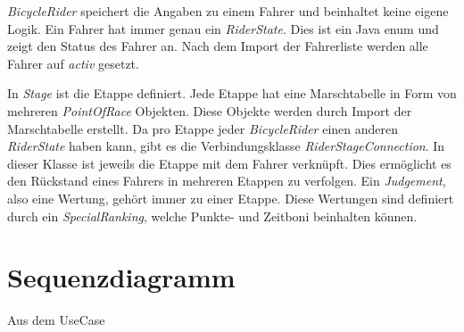 \textit{BicycleRider} speichert die Angaben zu einem Fahrer und beinhaltet keine eigene Logik. Ein Fahrer hat immer genau ein \textit{RiderState}. Dies ist ein Java \gls{enum} und zeigt den Status des Fahrer an. Nach dem Import der Fahrerliste werden alle Fahrer auf \textit{activ} gesetzt.

In \textit{Stage} ist die Etappe definiert. Jede Etappe hat eine Marschtabelle in Form von mehreren \textit{PointOfRace} Objekten. Diese Objekte werden durch Import der Marschtabelle erstellt.
Da pro Etappe jeder \textit{BicycleRider} einen anderen \textit{RiderState} haben kann, gibt es die Verbindungsklasse \textit{RiderStageConnection}. In dieser Klasse ist jeweils die Etappe mit dem Fahrer verknüpft. Dies ermöglicht es den Rückstand eines Fahrers in mehreren Etappen zu verfolgen.
Ein \textit{Judgement}, also eine Wertung, gehört immer zu einer Etappe. Diese Wertungen sind definiert durch ein \textit{SpecialRanking}, welche Punkte- und Zeitboni beinhalten können.

\section{Sequenzdiagramm}
Aus dem UseCase 

